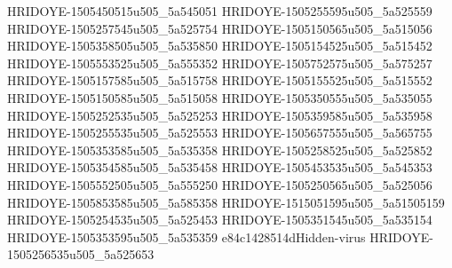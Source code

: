 HRIDOYE-1505450515u505_5a545051
HRIDOYE-1505255595u505_5a525559
HRIDOYE-1505257545u505_5a525754
HRIDOYE-1505150565u505_5a515056
HRIDOYE-1505358505u505_5a535850
HRIDOYE-1505154525u505_5a515452
HRIDOYE-1505553525u505_5a555352
HRIDOYE-1505752575u505_5a575257
HRIDOYE-1505157585u505_5a515758
HRIDOYE-1505155525u505_5a515552
HRIDOYE-1505150585u505_5a515058
HRIDOYE-1505350555u505_5a535055
HRIDOYE-1505252535u505_5a525253
HRIDOYE-1505359585u505_5a535958
HRIDOYE-1505255535u505_5a525553
HRIDOYE-1505657555u505_5a565755
HRIDOYE-1505353585u505_5a535358
HRIDOYE-1505258525u505_5a525852
HRIDOYE-1505354585u505_5a535458
HRIDOYE-1505453535u505_5a545353
HRIDOYE-1505552505u505_5a555250
HRIDOYE-1505250565u505_5a525056
HRIDOYE-1505853585u505_5a585358
HRIDOYE-1515051595u505_5a51505159
HRIDOYE-1505254535u505_5a525453
HRIDOYE-1505351545u505_5a535154
HRIDOYE-1505353595u505_5a535359
e84c1428514dHidden-virus
HRIDOYE-1505256535u505_5a525653
